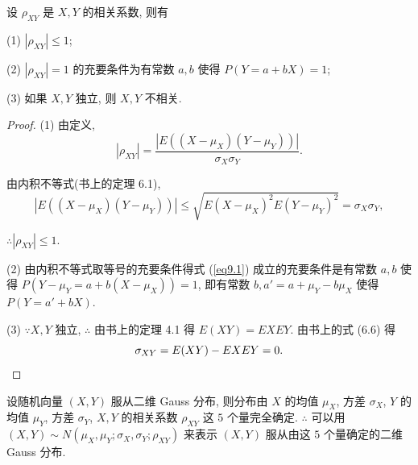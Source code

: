 \documentclass[color=black,device=normal,lang=cn]{elegantnote}
\numberwithin{equation}{section}
\theoremstyle{plain}
\numberwithin{exercise}{exsection}
\begin{document}
\begin{theorem}[书上的定理 6.2]
    设 $\rho_{XY}$ 是 $X,Y$ 的相关系数, 则有
    
    (1) $|\rho_{XY}|\leq 1$;

    (2) $|\rho_{XY}|=1$ 的充要条件为有常数 $a,b$ 使得 $P(Y=a+bX)=1$;

    (3) 如果 $X,Y$ 独立, 则 $X,Y$ 不相关.
\end{theorem}
\begin{proof}
    (1) 由定义,
    \[|\rho_{XY}|=\dfrac{|E((X-\mu_X)(Y-\mu_Y))|}{\sigma_X\sigma_Y}.\]

    由内积不等式(书上的定理 6.1),
    \begin{equation}\label{eq9.1}
        |E((X-\mu_X)(Y-\mu_Y))|\leq\sqrt{E(X-\mu_X)^2E(Y-\mu_Y)^2}=\sigma_X\sigma_Y,
    \end{equation}

    $\therefore|\rho_{XY}|\leq 1$.

    (2) 由内积不等式取等号的充要条件得式 (\ref{eq9.1}) 成立的充要条件是有常数 $a,b$ 使得 $P(Y-\mu_Y=a+b(X-\mu_X))=1$, 即有常数 $b,a'=a+\mu_Y-b\mu_X$ 使得 $P(Y=a'+bX)$.

    (3) $\because X,Y$ 独立, $\therefore$ 由书上的定理 4.1 得 $E(XY)=EXEY$. 由书上的式 (6.6) 得
    \[\sigma_{XY}=E(XY)-EXEY=0.\qedhere\]
\end{proof}

设随机向量 $(X,Y)$ 服从二维 Gauss 分布, 则分布由 $X$ 的均值 $\mu_X$, 方差 $\sigma_X$, $Y$ 的均值 $\mu_Y$, 方差 $\sigma_Y$, $X,Y$ 的相关系数 $\rho_{XY}$ 这 $5$ 个量完全确定. $\therefore$ 可以用 $(X,Y)\sim N(\mu_X,\mu_Y;\sigma_X,\sigma_Y;\rho_{XY})$ 来表示 $(X,Y)$ 服从由这 $5$ 个量确定的二维 Gauss 分布.
\end{document}
